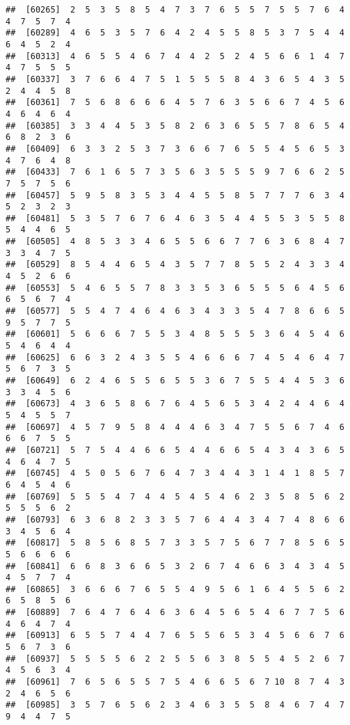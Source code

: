 \documentclass[
]{book}
\begin{document}
\begin{verbatim}
##  [60265]  2  5  3  5  8  5  4  7  3  7  6  5  5  7  5  5  7  6  4  4  7  5  7  4
##  [60289]  4  6  5  3  5  7  6  4  2  4  5  5  8  5  3  7  5  4  4  6  4  5  2  4
##  [60313]  4  6  5  5  4  6  7  4  4  2  5  2  4  5  6  6  1  4  7  4  7  5  5  5
##  [60337]  3  7  6  6  4  7  5  1  5  5  5  8  4  3  6  5  4  3  5  2  4  4  5  8
##  [60361]  7  5  6  8  6  6  6  4  5  7  6  3  5  6  6  7  4  5  6  4  6  4  6  4
##  [60385]  3  3  4  4  5  3  5  8  2  6  3  6  5  5  7  8  6  5  4  6  8  2  3  6
##  [60409]  6  3  3  2  5  3  7  3  6  6  7  6  5  5  4  5  6  5  3  4  7  6  4  8
##  [60433]  7  6  1  6  5  7  3  5  6  3  5  5  5  9  7  6  6  2  5  7  5  7  5  6
##  [60457]  5  9  5  8  3  5  3  4  4  5  5  8  5  7  7  7  6  3  4  5  2  3  2  3
##  [60481]  5  3  5  7  6  7  6  4  6  3  5  4  4  5  5  3  5  5  8  5  4  4  6  5
##  [60505]  4  8  5  3  3  4  6  5  5  6  6  7  7  6  3  6  8  4  7  3  3  4  7  5
##  [60529]  8  5  4  4  6  5  4  3  5  7  7  8  5  5  2  4  3  3  4  4  5  2  6  6
##  [60553]  5  4  6  5  5  7  8  3  3  5  3  6  5  5  5  6  4  5  6  6  5  6  7  4
##  [60577]  5  5  4  7  4  6  4  6  3  4  3  3  5  4  7  8  6  6  5  9  5  7  7  5
##  [60601]  5  6  6  6  7  5  5  3  4  8  5  5  5  3  6  4  5  4  6  5  4  6  4  4
##  [60625]  6  6  3  2  4  3  5  5  4  6  6  6  7  4  5  4  6  4  7  5  6  7  3  5
##  [60649]  6  2  4  6  5  5  6  5  5  3  6  7  5  5  4  4  5  3  6  3  3  4  5  6
##  [60673]  4  3  6  5  8  6  7  6  4  5  6  5  3  4  2  4  4  6  4  5  4  5  5  7
##  [60697]  4  5  7  9  5  8  4  4  4  6  3  4  7  5  5  6  7  4  6  6  6  7  5  5
##  [60721]  5  7  5  4  4  6  6  5  4  4  6  6  5  4  3  4  3  6  5  4  6  4  7  5
##  [60745]  4  5  0  5  6  7  6  4  7  3  4  4  3  1  4  1  8  5  7  6  4  5  4  6
##  [60769]  5  5  5  4  7  4  4  5  4  5  4  6  2  3  5  8  5  6  2  5  5  5  6  2
##  [60793]  6  3  6  8  2  3  3  5  7  6  4  4  3  4  7  4  8  6  6  3  4  5  6  4
##  [60817]  5  8  5  6  8  5  7  3  3  5  7  5  6  7  7  8  5  6  5  5  6  6  6  6
##  [60841]  6  6  8  3  6  6  5  3  2  6  7  4  6  6  3  4  3  4  5  4  5  7  7  4
##  [60865]  3  6  6  6  7  6  5  5  4  9  5  6  1  6  4  5  5  6  2  6  5  8  5  6
##  [60889]  7  6  4  7  6  4  6  3  6  4  5  6  5  4  6  7  7  5  6  4  6  4  7  4
##  [60913]  6  5  5  7  4  4  7  6  5  5  6  5  3  4  5  6  6  7  6  5  6  7  3  6
##  [60937]  5  5  5  5  6  2  2  5  5  6  3  8  5  5  4  5  2  6  7  4  5  6  3  4
##  [60961]  7  6  5  6  5  5  7  5  4  6  6  5  6  7 10  8  7  4  3  2  4  6  5  6
##  [60985]  3  5  7  6  5  6  2  3  4  6  3  5  5  8  4  6  7  4  7  9  4  4  7  5

\end{verbatim}
\end{document}
